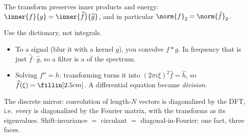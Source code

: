 \begin{theorem}\label{thm:parseval}
The transform preserves inner products and energy:
$\inner{f}{g}=\inner{\widehat f}{\widehat g}$, and in particular $\norm{f}_2=\norm{\widehat f}_2$.
\end{theorem}

\begin{yourturn}
Use the dictionary, not integrals.
\begin{itemize}[leftmargin=1.3em,itemsep=1pt]
  \item To  a signal (blur it with a kernel $g$), you convolve $f*g$. In frequency
        that is just $\widehat f\cdot\widehat g$, so a filter is a \fillin[3cm] of the spectrum.
  \item Solving $f''=h$: transforming turns it into $(2\pi i\xi)^2\widehat f=\widehat h$, so
        $\widehat f(\xi)=\fillin[2.5cm]$. A differential equation became \emph{division}.
\end{itemize}
\end{yourturn}

\begin{strand}
The discrete mirror: convolution of length-$N$ vectors is diagonalized by the DFT, i.e.\ every
 is diagonalized by the Fourier matrix, with the transforms as its
eigenvalues. Shift-invariance $=$ circulant $=$ diagonal-in-Fourier; one fact, three faces.
\end{strand}
